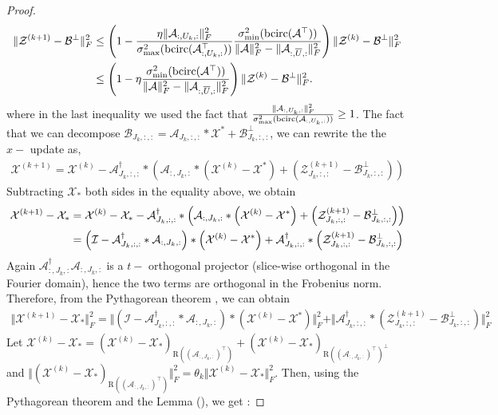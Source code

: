 \documentclass[11pt]{article}
\def\fm#1{\mathcal{#1}}
\def\b{\beta}
\def \a#1{\fm A_{:, #1, :}}
\def \b#1{\fm B_{#1, :, :}}
\def \ai#1{\fm A_{#1, :, :}}
\def \z#1#2{\fm Z^{(#1)}_{#2, :, :}}
\def \bp#1{\fm B^{\perp}_{#1, :, :}}
\def \x#1{\fm X^{(#1)}}
\begin{document}
\begin{proof}
\begin{align}
     \Vert   \fm Z^{(k+1)} - \fm B^\perp  \Vert_F^2  & \leq  \left( 1 - \frac{\eta \Vert \a{U_k} \Vert_F^2}{ \sigma_{\max}^2(\bcirc(\a{U_k}^\top)) } \frac{\sigma_{\min}^2(\bcirc(\fm A^\top))}{\Vert \fm A \Vert_F^2 - \Vert \a{\overline{U}} \Vert_F^2}   \right) \Vert  \fm Z^{(k)} - \fm B^\perp \Vert_F^2  \notag \\
     & \leq \left( 1 - \eta  \frac{\sigma_{\min}^2(\bcirc(\fm A^\top))}{\Vert \fm A \Vert_F^2 - \Vert \a{\overline{U}} \Vert_F^2}   \right) \Vert  \fm Z^{(k)} - \fm B^\perp \Vert_F^2 .
\end{align}
where  in the last inequality we used the fact that $\frac{\Vert \a{U_k}\Vert_F^2 }{\sigma_{\max}^2(\bcirc(\a{U_k}))}\geq 1$. The fact that  we can decompose $\b{J_k} = \ai{J_k}*\fm X^\ast + \bp{J_k} $, we can rewrite the the $x-$ update as,
\begin{align*}
   \fm X^{(k+1)} = \x k - \ai{J_k}^\dagger * \left( \a{J_k} *\left(\x k - \fm X^\ast \right) + \left(\z{k+1}{J_k} - \bp{J_k}  \right)\right)
\end{align*}
Subtracting $\fm X_\ast$  both sides  in the equality above, we obtain
\begin{align}
   \x {k+1} - \fm X_\ast  & =  \x{k} - \fm X_\ast  - \ai{J_k}^\dagger * \left( \a{J_k} *\left(\x k - \fm X^\ast \right) + \left(\z{k+1}{J_k} - \bp{J_k}  \right)\right) \notag\\
   & =  \left( \fm I - \ai{J_k}^\dagger *  \a{J_k} \right) *\left(\x k - \fm X^\ast   \right) +  \ai{J_k}^\dagger* \left(\z{k+1}{J_k} - \bp{J_k}  \right)
\end{align}
Again $\a{J_k}^\dagger \a{J_k}$ is a $t-$ orthogonal projector  (slice-wise  orthogonal in the Fourier  domain), hence the two terms are orthogonal in the Frobenius norm. Therefore,  from the  Pythagorean theorem , we can obtain
\begin{align}
    \Vert \x{k+1} - \fm X_\ast \Vert_F^2 = \Vert \left( \fm I - \ai{J_k}^\dagger *  \a{J_k} \right) *\left(\x k - \fm X^\ast   \right) \Vert_F^2  +  \Vert  \ai{J_k}^\dagger* \left(\z{k+1}{J_k} - \bp{J_k}  \right) \Vert_F^2  \label{eq:eq-5}
\end{align}
Let  $\x{k}-\fm X_\ast = \left( \x{k} - \fm X_\ast \right)_{\text{R}((\a{J_k})^\top)} + \left(\x k - \fm X_\ast \right)_{\text{R}((\a{J_k})^\top)^\perp }$ and $\Vert \left( \x{k} - \fm X_\ast \right)_{\text{R}((\a{J_k})^\top)} \Vert_F^2  = \theta_k \Vert \x k - \fm X_\ast \Vert_F^2$. Then, using the Pythagorean theorem and the  Lemma (), we get :

\end{proof}
\end{document}
